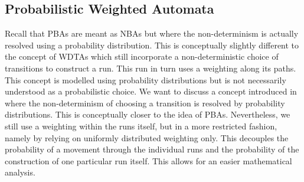 \subsection{Probabilistic Weighted Automata}
Recall that \acp{PBA} are meant as \acp{NBA} but where the non-determinism is
actually resolved using a probability distribution. This is conceptually 
slightly different to the concept of \acp{WDTA} which still incorporate a 
non-deterministic choice of transitions to construct a run. This run in turn 
uses a weighting along its paths. This concept is modelled using probability 
distributions but is not necessarily understood as a probabilistic choice. We 
want to discuss a concept introduced in \cite[Chapter 4]{RandAutoInfTrees} 
where the non-determinism of choosing a transition is resolved by probability 
distributions. This is conceptually closer to the idea of \acp{PBA}. 
Nevertheless, we still use a weighting within the runs itself, but in a more 
restricted fashion, namely by relying on uniformly distributed weighting only. 
This decouples the probability of a movement through the individual runs and 
the probability of the construction of one particular run itself. This allows 
for an easier mathematical analysis.

